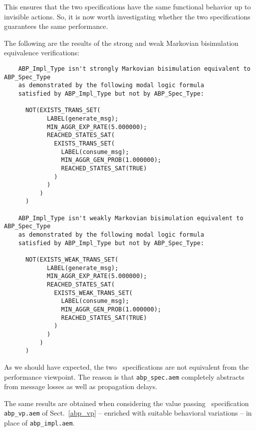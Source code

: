 \noindent This ensures that the two specifications have the same functional behavior up to invisible
actions. So, it is now worth investigating whether the two specifications guarantees the same performance.

The following are the results of the strong and weak Markovian bisimulation equivalence verifications:

	\begin{verbatim}
    ABP_Impl_Type isn't strongly Markovian bisimulation equivalent to ABP_Spec_Type
    as demonstrated by the following modal logic formula
    satisfied by ABP_Impl_Type but not by ABP_Spec_Type:

      NOT(EXISTS_TRANS_SET(
            LABEL(generate_msg); 
            MIN_AGGR_EXP_RATE(5.000000); 
            REACHED_STATES_SAT(
              EXISTS_TRANS_SET(
                LABEL(consume_msg); 
                MIN_AGGR_GEN_PROB(1.000000); 
                REACHED_STATES_SAT(TRUE)
              )
            )
          )
      )

    ABP_Impl_Type isn't weakly Markovian bisimulation equivalent to ABP_Spec_Type
    as demonstrated by the following modal logic formula
    satisfied by ABP_Impl_Type but not by ABP_Spec_Type:

      NOT(EXISTS_WEAK_TRANS_SET(
            LABEL(generate_msg); 
            MIN_AGGR_EXP_RATE(5.000000); 
            REACHED_STATES_SAT(
              EXISTS_WEAK_TRANS_SET(
                LABEL(consume_msg); 
                MIN_AGGR_GEN_PROB(1.000000); 
                REACHED_STATES_SAT(TRUE)
              )
            )
          )
      )
	\end{verbatim}

\noindent As we should have expected, the two \aemilia\ specifications are not equivalent from the
performance viewpoint. The reason is that {\tt abp\_spec.aem} completely abstracts from message losses as
well as propagation delays.

The same results are obtained when considering the value passing \aemilia\ specification {\tt abp\_vp.aem}
of Sect.~\ref{abp_vp} -- enriched with suitable behavioral variations -- in place of {\tt abp\_impl.aem}.
